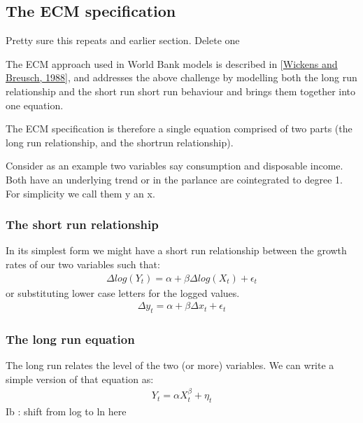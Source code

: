 \documentclass[letterpaper,10pt,english]{jupyterBook}
\begin{document}
\subsection{The ECM specification}
\label{\detokenize{content/06_WBModels/LoadingWBModel:the-ecm-specification}}
\sphinxAtStartPar
 Pretty sure this repeats and earlier section.  Delete one 

\sphinxAtStartPar
The ECM approach used in World Bank models is described in {[}\hyperlink{cite.content/99_BackMatter/References:id16}{Wickens and Breusch, 1988}{]}, and addresses the above challenge by modelling both the long run relationship and the short run short run behaviour and brings them together into one equation.

\sphinxAtStartPar
The ECM specification is therefore a single equation comprised of two parts (the long run relationship, and the short\sphinxhyphen{}run relationship).

\sphinxAtStartPar
Consider as an example two variables say consumption and disposable income.  Both have an underlying trend or in the parlance are co\sphinxhyphen{}integrated to degree 1.  For simplicity we call them y an x.


\subsubsection{The short run relationship}
\label{\detokenize{content/06_WBModels/LoadingWBModel:the-short-run-relationship}}
\sphinxAtStartPar
In its simplest form we might have a short run relationship between the growth rates of our two variables such that:
\begin{equation*}
\begin{split}\Delta log(Y_t) = \alpha + \beta \Delta log(X_t) +\epsilon_t\end{split}
\end{equation*}
\sphinxAtStartPar
or substituting lower case letters for the logged values.
\begin{equation*}
\begin{split}\Delta y_t = \alpha + \beta \Delta x_t +\epsilon_t\end{split}
\end{equation*}

\subsubsection{The long run equation}
\label{\detokenize{content/06_WBModels/LoadingWBModel:the-long-run-equation}}
\sphinxAtStartPar
The long run relates the level of the two (or more) variables.  We can write a simple version of that equation as:
\begin{equation*}
\begin{split}Y_t=αX_t^β+ \eta_t\end{split}
\end{equation*}
\sphinxAtStartPar
Ib : shift from log to ln here
\end{document}

